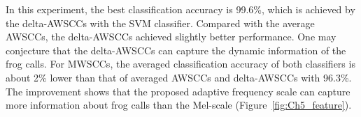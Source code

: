 \begin{table}[htb!]
\centering
\caption{Weighted classification accuracy (mean and standard deviation) comparison for five feature sets with two classifiers.}
\label{tab:accuracyfor24}
\end{table}

In this experiment, the best classification accuracy is 99.6\%, which is achieved by the delta-AWSCCs with the SVM classifier. Compared with the average AWSCCs, the delta-AWSCCs achieved slightly better performance. One may conjecture that the delta-AWSCCs can capture the dynamic information of the frog calls. For MWSCCs, the averaged classification accuracy of both classifiers is about 2\% lower than that of averaged AWSCCs and delta-AWSCCs with 96.3\%. The improvement shows that the proposed adaptive frequency scale can capture more information about frog calls than the Mel-scale (Figure~\ref{fig:Ch5_feature}). 

